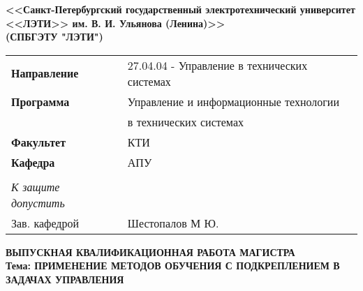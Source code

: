 \thispagestyle{empty}%
\makeatletter
{}
%
\makeatother


\begin{center}
\hfill \break
\small{\textbf{<<Санкт-Петербургский государственный электротехнический университет}}\\
\small{\textbf{<<ЛЭТИ>> им. В. И. Ульянова (Ленина)>>}}\\
\small{\textbf{(СПБГЭТУ "ЛЭТИ")}}\\
\hfill \break

\begin{center}
\begin{tabular}{ll}
\textbf{Направление} & \hspace{90pt}27.04.04 - Управление в технических системах \\
\textbf{Программа} &  \hspace{90pt}Управление и информационные технологии \\ & \hspace{90pt} в технических системах \\
\textbf{Факультет} & \hspace{90pt}КТИ \\
\textbf{Кафедра} & \hspace{90pt}АПУ \\
\\
\textit{К защите допустить} & \\
Зав. кафедрой &  \hspace{220pt} Шестопалов М Ю.
\end{tabular}
\end{center}

\normalsize{}
\vspace{2.5cm}
\large{\textbf{ВЫПУСКНАЯ КВАЛИФИКАЦИОННАЯ РАБОТА МАГИСТРА}}\\
\vspace{1cm}
\normalsize{\textbf{Тема: ПРИМЕНЕНИЕ МЕТОДОВ 
		ОБУЧЕНИЯ С ПОДКРЕПЛЕНИЕМ В ЗАДАЧАХ УПРАВЛЕНИЯ
		}}\\
\vspace{1cm}
 

\end{center}
